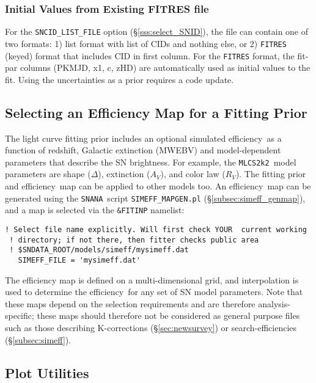 \documentclass[12pt]{article}
\newcommand{\mlcs}{{\tt MLCS2k2}}
\newcommand{\snana}{{\tt SNANA}}
\newcommand{\eff}{efficiency}
\begin{document}
\subsubsection{Initial Values from Existing FITRES file}
\label{sss:fitres_initial_values}

For the {\tt SNCID\_LIST\_FILE} option (\S\ref{sss:select_SNID}),
the file can contain one of two formats:
1) list format with list of CIDs and nothing else, or 
2) {\tt FITRES} (keyed) format that includes CID in first column.
For the {\tt FITRES} format, the fit-par columns (PKMJD, x1, c, zHD)
are automatically used as initial values to the fit.
Using the uncertainties as a prior requires a code update.


   \subsection{Selecting an Efficiency Map for a Fitting Prior}
   \label{subsec:prior_eff}

The light curve fitting prior includes an optional 
simulated \eff\ as a function of redshift, 
Galactic extinction (MWEBV) and model-dependent parameters 
that describe the SN brightness.
For example, the \mlcs\ model parameters are shape
($\Delta$), extinction ($A_V$), and color law ($R_V$).
The fitting prior and \eff\ map can be applied to 
other models too.
An \eff\ map can be generated using the \snana\ script
{\tt SIMEFF\_MAPGEN.pl} (\S\ref{subsec:simeff_genmap}),
and a map is selected via the {\tt \&FITINP} namelist: 
%
\begin{Verbatim}[frame=single]
 ! Select file name explicitly. Will first check YOUR  current working 
 ! directory; if not there, then fitter checks public area 
 ! $SNDATA_ROOT/models/simeff/mysimeff.dat
   SIMEFF_FILE = 'mysimeff.dat'
\end{Verbatim}
The efficiency map is defined on a multi-dimensional grid,
and interpolation is used to determine the \eff\ for any 
set of SN  model parameters.  
Note that these maps depend on the selection
requirements and are therefore analysis-specific;
these maps should therefore not be considered as
general purpose files such as those describing
K-corrections (\S\ref{sec:newsurvey}) or
search-efficiencies (\S\ref{subsec:simeff}).


 \clearpage
 \subsection{Plot Utilities}
   \label{subsec:plot_util}
\end{document}
